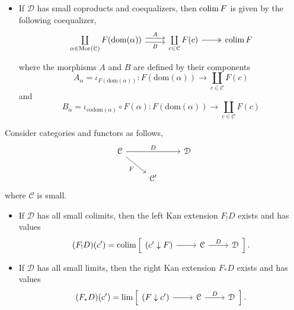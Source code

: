 \documentclass[main.tex]{subfiles}
\begin{document}
\begin{fact}
\begin{itemize}
    \item If $\mathcal{D}$ has small coproducts and coequalizers, then $\operatorname*{colim} F$ is given by the following coequalizer,
      \begin{equation*}
        \begin{tikzcd}
          \coprod\limits_{\alpha \in \mathrm{Mor}(\mathcal{C})} F(\mathrm{dom}(\alpha))
          \arrow[r, shift left, "A"]
          \arrow[r, swap, shift right, "B"]
          & \coprod\limits_{c \in \mathcal{C}} F(c)
          \arrow[r, twoheadrightarrow]
          & \colim F
        \end{tikzcd}
      \end{equation*}
      where the morphisms $A$ and $B$ are defined by their components
      \begin{equation*}
        A_{\alpha} = \iota_{F(\mathrm{dom}(\alpha))}\colon F(\mathrm{dom}(\alpha)) \to \coprod_{c \in \mathcal{C}} F(c)
      \end{equation*}
      and
      \begin{equation*}
        B_{\alpha} = \iota_{\mathrm{codom}(\alpha)} \circ F(\alpha) \colon F(\mathrm{dom}(\alpha)) \to \coprod_{c \in \mathcal{C}} F(c)
      \end{equation*}
  \end{itemize}
\end{fact}

\begin{fact}
  \label{fact:pointwise_formula_kan_extensions}
  Consider categories and functors as follows,
  \begin{equation*}
    \begin{tikzcd}
      \mathcal{C}
      \arrow[dr, swap, "F"]
      \arrow[rr, "D"]
      && \mathcal{D}
      \\
      & \mathcal{C}'
    \end{tikzcd}
  \end{equation*}
  where $\mathcal{C}$ is small. 
  \begin{itemize}
    \item If $\mathcal{D}$ has all small colimits, then the left Kan extension $F_{!}D$ exists and has values
      \begin{equation*}
        (F_{!}D)(c') = \colim \left[ \begin{tikzcd} (c' \downarrow F) \arrow[r] & \mathcal{C} \arrow[r, "D"] & \mathcal{D} \end{tikzcd} \right].
      \end{equation*}

    \item If $\mathcal{D}$ has all small limits, then the right Kan extension $F_{*}D$ exists and has values
      \begin{equation*}
        (F_{*}D)(c') = \lim \left[ \begin{tikzcd} (F \downarrow c') \arrow[r] & \mathcal{C} \arrow[r, "D"] & \mathcal{D} \end{tikzcd} \right].
      \end{equation*}
  \end{itemize}
\end{fact}
\end{document}
